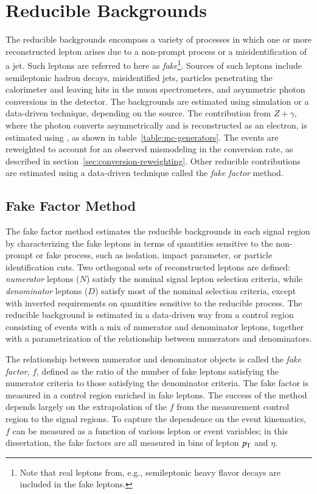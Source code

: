 \section{Reducible Backgrounds}\label{sec:reducible-backgrounds}
The reducible backgrounds encompass a variety of processes in which one or more reconstructed lepton arises due to a non-prompt process or a misidentification of a jet. Such leptons are referred to here as \emph{fake}\footnote{Note that real leptons from, e.g., semileptonic heavy flavor decays are included in the fake leptons.}. Sources of such leptons include semileptonic hadron decays, misidentified jets, particles penetrating the calorimeter and leaving hits in the muon spectrometers, and asymmetric photon conversions in the detector. The backgrounds are estimated using simulation or a data-driven technique, depending on the source.  The contribution from $Z+\gamma$, where the photon converts asymmetrically and is reconstructed as an electron, is estimated using \sherpa, as shown in table~\ref{table:mc-generators}. The events are reweighted to account for an observed mismodeling in the conversion rate, as described in section~\ref{sec:conversion-reweighting}. Other reducible contributions are estimated using a data-driven technique called the \emph{fake factor} method. 


\subsection{Fake Factor Method}\label{sec:fake-factor-method}
The fake factor method estimates the reducible backgrounds in each signal region by characterizing the fake leptons in terms of quantities sensitive to the non-prompt or fake process, such as isolation, impact parameter, or particle identification cuts. Two orthogonal sets of reconstructed leptons are defined: \emph{numerator} leptons ($N$) satisfy the nominal signal lepton selection criteria, while \emph{denominator} leptons ($D$) satisfy most of the nominal selection criteria, except with inverted requirements on quantities sensitive to the reducible process. The reducible background is estimated in a data-driven way from a control region consisting of events with a mix of numerator and denominator leptons, together with a parametrization of the relationship between numerators and denominators. 

The relationship between numerator and denominator objects is called the \emph{fake factor}, $f$, defined as the ratio of the number of fake leptons satisfying the numerator criteria to those satisfying the denominator criteria. The fake factor is measured in a control region enriched in fake leptons. The success of the method depends largely on the extrapolation of the $f$ from the measurement control region to the signal regions. To capture the dependence on the event kinematics, $f$ can be measured as a function of various lepton or event variables; in this dissertation, the fake factors are all measured in bins of lepton $p_{\text{T}}$ and $\eta$. 

